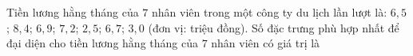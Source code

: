 \begin{ex}
Tiền lương hằng tháng của $7$ nhân viên trong một công ty du lịch lần lượt là: $6{,}5$; $8{,}4$; $6{,}9$; $7{,}2$; $2{,}5$; $6{,}7$; $3{,}0$ (đơn vị: triệu đồng). Số đặc trưng phù hợp nhất để đại diện cho tiền lương hằng tháng của $7$ nhân viên có giá trị là
\end{ex}
